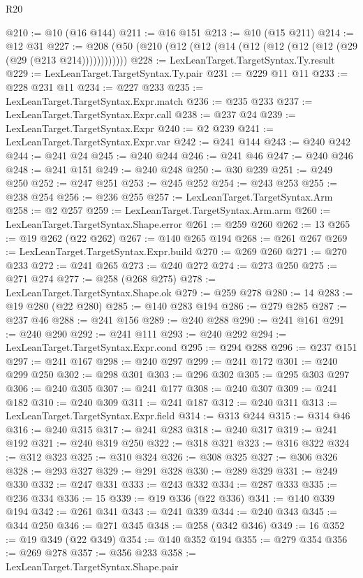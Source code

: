 \begin{lexlean}{R20}
\begin{coremodule}
@210 := @10 (@16 @144)
@211 := @16 @151
@213 := @10 (@15 @211)
@214 := @12 @31
@227 := @208 (@50 (@210 (@12 (@12 (@14 (@12 (@12 (@12 (@12 (@29 (@29 (@213 @214))))))))))))
@228 := LexLeanTarget.TargetSyntax.Ty.result
@229 := LexLeanTarget.TargetSyntax.Ty.pair
@231 := @229 @11 @11
@233 := @228 @231 @11
@234 := @227 @233
@235 := LexLeanTarget.TargetSyntax.Expr.match
@236 := @235 @233
@237 := LexLeanTarget.TargetSyntax.Expr.call
@238 := @237 @24
@239 := LexLeanTarget.TargetSyntax.Expr
@240 := @2 @239
@241 := LexLeanTarget.TargetSyntax.Expr.var
@242 := @241 @144
@243 := @240 @242
@244 := @241 @24
@245 := @240 @244
@246 := @241 @46
@247 := @240 @246
@248 := @241 @151
@249 := @240 @248
@250 := @30 @239
@251 := @249 @250
@252 := @247 @251
@253 := @245 @252
@254 := @243 @253
@255 := @238 @254
@256 := @236 @255
@257 := LexLeanTarget.TargetSyntax.Arm
@258 := @2 @257
@259 := LexLeanTarget.TargetSyntax.Arm.arm
@260 := LexLeanTarget.TargetSyntax.Shape.error
@261 := @259 @260
@262 := 13
@265 := @19 @262 (@22 @262)
@267 := @140 @265 @194
@268 := @261 @267
@269 := LexLeanTarget.TargetSyntax.Expr.build
@270 := @269 @260
@271 := @270 @233
@272 := @241 @265
@273 := @240 @272
@274 := @273 @250
@275 := @271 @274
@277 := @258 (@268 @275)
@278 := LexLeanTarget.TargetSyntax.Shape.ok
@279 := @259 @278
@280 := 14
@283 := @19 @280 (@22 @280)
@285 := @140 @283 @194
@286 := @279 @285
@287 := @237 @46
@288 := @241 @156
@289 := @240 @288
@290 := @241 @161
@291 := @240 @290
@292 := @241 @111
@293 := @240 @292
@294 := LexLeanTarget.TargetSyntax.Expr.cond
@295 := @294 @288
@296 := @237 @151
@297 := @241 @167
@298 := @240 @297
@299 := @241 @172
@301 := @240 @299 @250
@302 := @298 @301
@303 := @296 @302
@305 := @295 @303 @297
@306 := @240 @305
@307 := @241 @177
@308 := @240 @307
@309 := @241 @182
@310 := @240 @309
@311 := @241 @187
@312 := @240 @311
@313 := LexLeanTarget.TargetSyntax.Expr.field
@314 := @313 @244
@315 := @314 @46
@316 := @240 @315
@317 := @241 @283
@318 := @240 @317
@319 := @241 @192
@321 := @240 @319 @250
@322 := @318 @321
@323 := @316 @322
@324 := @312 @323
@325 := @310 @324
@326 := @308 @325
@327 := @306 @326
@328 := @293 @327
@329 := @291 @328
@330 := @289 @329
@331 := @249 @330
@332 := @247 @331
@333 := @243 @332
@334 := @287 @333
@335 := @236 @334
@336 := 15
@339 := @19 @336 (@22 @336)
@341 := @140 @339 @194
@342 := @261 @341
@343 := @241 @339
@344 := @240 @343
@345 := @344 @250
@346 := @271 @345
@348 := @258 (@342 @346)
@349 := 16
@352 := @19 @349 (@22 @349)
@354 := @140 @352 @194
@355 := @279 @354
@356 := @269 @278
@357 := @356 @233
@358 := LexLeanTarget.TargetSyntax.Shape.pair

\end{coremodule}
\end{lexlean}
